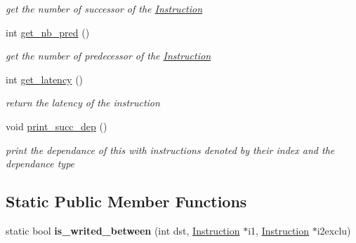 \begin{DoxyCompactItemize}
\begin{DoxyCompactList}\small\item\em get the number of successor of the \hyperlink{class_instruction}{Instruction} \end{DoxyCompactList}\item 
\hypertarget{class_instruction_a9e56e8e2c857abc409f27af9f80f9595}{int \hyperlink{class_instruction_a9e56e8e2c857abc409f27af9f80f9595}{get\+\_\+nb\+\_\+pred} ()}\label{class_instruction_a9e56e8e2c857abc409f27af9f80f9595}

\begin{DoxyCompactList}\small\item\em get the number of predecessor of the \hyperlink{class_instruction}{Instruction} \end{DoxyCompactList}\item 
\hypertarget{class_instruction_ac2988d2fb858b720e009da03120ae4c7}{int \hyperlink{class_instruction_ac2988d2fb858b720e009da03120ae4c7}{get\+\_\+latency} ()}\label{class_instruction_ac2988d2fb858b720e009da03120ae4c7}

\begin{DoxyCompactList}\small\item\em return the latency of the instruction \end{DoxyCompactList}\item 
\hypertarget{class_instruction_af489e680ae3c69fd12b0a23e959172e5}{void \hyperlink{class_instruction_af489e680ae3c69fd12b0a23e959172e5}{print\+\_\+succ\+\_\+dep} ()}\label{class_instruction_af489e680ae3c69fd12b0a23e959172e5}

\begin{DoxyCompactList}\small\item\em print the dependance of this with instructions denoted by their index and the dependance type \end{DoxyCompactList}\end{DoxyCompactItemize}
\subsection*{Static Public Member Functions}
\begin{DoxyCompactItemize}
\item 
\hypertarget{class_instruction_ae309ff37d134500f75e1180182b02a6b}{static bool {\bfseries is\+\_\+writed\+\_\+between} (int dst, \hyperlink{class_instruction}{Instruction} $\ast$i1, \hyperlink{class_instruction}{Instruction} $\ast$i2exclu)}\label{class_instruction_ae309ff37d134500f75e1180182b02a6b}

\end{DoxyCompactItemize}
